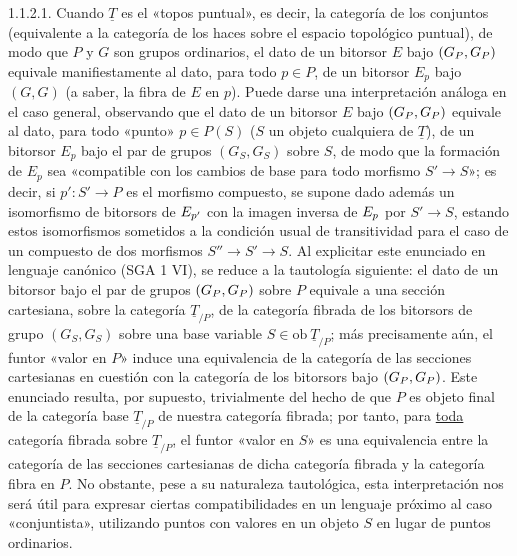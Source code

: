 1.1.2.1.  Cuando $\underline{T}$ es el «topos puntual», es decir, la
categoría de los conjuntos (equivalente a la categoría de los haces
sobre el espacio topológico puntual), de modo que $P$ y $G$ son grupos
ordinarios, el dato de un bitorsor $E$ bajo
$(\sisi{G_P}{G_P},\sisi{G_P}{G_P})$ equivale
manifiestamente al dato, para todo $p \in P$, de un bitorsor $E_p$ bajo
$(G,G)$ (a saber, la fibra de $E$ en $p$). Puede darse una
interpretación análoga en el caso general, observando que el dato de un
bitorsor $E$ bajo $(\sisi{G_P}{G_P},\sisi{G_P}{G_P})$ equivale al dato,
para todo «punto»
$p \in P(S)$ ($S$ un objeto cualquiera de $\underline{T}$), de un
bitorsor $E_p$ bajo
el par de grupos $(G_S,G_S)$ sobre $S$, de modo que la formación de
$E_p$ sea «compatible con los cambios de base para todo morfismo
$S' \longrightarrow S$»; es decir, si $p' : S' \longrightarrow P$ es
el morfismo compuesto, se supone dado además un isomorfismo de
bitorsors de $\sisi{P_p}{E_{p'}}$ con la imagen inversa de
$\sisi{P_p}{E_p}$ por $S' \longrightarrow S$, estando estos
isomorfismos sometidos a la condición usual de transitividad para el
caso de un compuesto de dos morfismos
$S'' \longrightarrow S' \longrightarrow S$. Al explicitar este
enunciado en lenguaje canónico (SGA 1 VI), se reduce a la tautología
siguiente: el dato de un bitorsor bajo el par de grupos
$(\sisi{G_P}{G_P},\sisi{G_P}{G_P})$
sobre $P$ equivale a una sección cartesiana, sobre la categoría
$\underline{T}_{/P}$, de la categoría fibrada de los bitorsors de grupo
$(G_S,G_S)$ sobre una base variable
$S \in \mathrm{ob}\ \underline{T}_{/P}$; más precisamente aún, el
funtor «valor en $P$» induce una equivalencia de la categoría de las
secciones cartesianas en cuestión con la categoría de los bitorsors bajo
$(\sisi{G_P}{G_P},\sisi{G_P}{G_P})$. Este enunciado resulta, por
supuesto, trivialmente del hecho
de que $P$ es objeto final de la categoría base $\underline{T}_{/P}$ de
nuestra categoría fibrada; por tanto, para \underline{toda} categoría
fibrada sobre $\underline{T}_{/P}$, el funtor «valor en $S$» es una
equivalencia entre la categoría de las secciones cartesianas de dicha
categoría fibrada y la categoría fibra en $P$. No obstante, pese a su
naturaleza tautológica, esta interpretación nos será útil para expresar
ciertas compatibilidades en un lenguaje próximo al caso «conjuntista»,
utilizando puntos con valores en un objeto $S$ en lugar de puntos
ordinarios.
